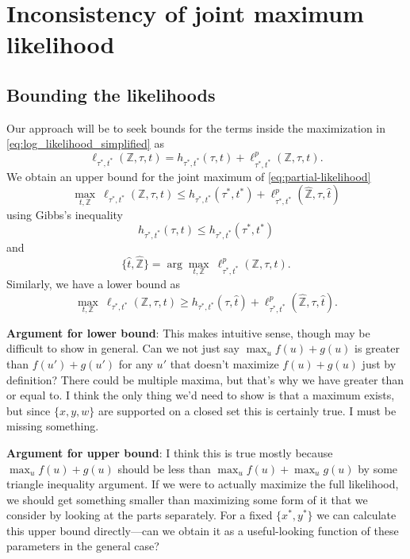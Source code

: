 \documentclass[a4paper]{article}
\newcommand{\fullAncestralStateCategories}{\mathbb{Z}}
\begin{document}
\section{Inconsistency of joint maximum likelihood}

\subsection{Bounding the likelihoods}

Our approach will be to seek bounds for the terms inside the maximization in \eqref{eq:log_likelihood_simplified} as
\begin{equation}
\label{eq:partial-likelihood}
\ell_{\tau^*,t^*}(\fullAncestralStateCategories,\tau,t) = h_{\tau^*,t^*}(\tau,t) + \ell^p_{\tau^*,t^*}(\fullAncestralStateCategories,\tau,t).
\end{equation}
We obtain an upper bound for the joint maximum of \eqref{eq:partial-likelihood}
$$
\max_{t,\fullAncestralStateCategories} \ \ell_{\tau^*,t^*}(\fullAncestralStateCategories,\tau,t) \le
    h_{\tau^*,t^*}(\tau^*,t^*)
    + \ell^p_{\tau^*,t^*}(\hat{\fullAncestralStateCategories},\tau,\hat{t})
$$
using Gibbs's inequality
$$
h_{\tau^*,t^*}(\tau,t) \le h_{\tau^*,t^*}(\tau^*,t^*)
$$
and
$$
\{\hat{t},\hat{\fullAncestralStateCategories}\} = \arg\max_{t,\fullAncestralStateCategories} \ \ell^p_{\tau^*,t^*}(\fullAncestralStateCategories,\tau,t).
$$
Similarly, we have a lower bound as
$$
\max_{t,\fullAncestralStateCategories} \ \ell_{\tau^*,t^*}(\fullAncestralStateCategories,\tau,t) \ge
    h_{\tau^*,t^*}(\tau,\hat{t})
    + \ell^p_{\tau^*,t^*}(\hat{\fullAncestralStateCategories},\tau,\hat{t}).
$$

\textbf{Argument for lower bound}: This makes intuitive sense, though may be difficult to show in general.
Can we not just say $\max_u f(u) + g(u)$ is greater than $f(u') + g(u')$ for any $u'$ that doesn't maximize $f(u) + g(u)$ just by definition?
There could be multiple maxima, but that's why we have greater than or equal to.
I think the only thing we'd need to show is that a maximum exists, but since $\{x,y,w\}$ are supported on a closed set this is certainly true.
I must be missing something.

\textbf{Argument for upper bound}: I think this is true mostly because $\max_u f(u) + g(u)$ should be less than $\max_u f(u) + \max_u g(u)$ by some triangle inequality argument.
If we were to actually maximize the full likelihood, we should get something smaller than maximizing some form of it that we consider by looking at the parts separately.
For a fixed $\{x^*, y^*\}$ we can calculate this upper bound directly---can we obtain it as a useful-looking function of these parameters in the general case?
\end{document}
